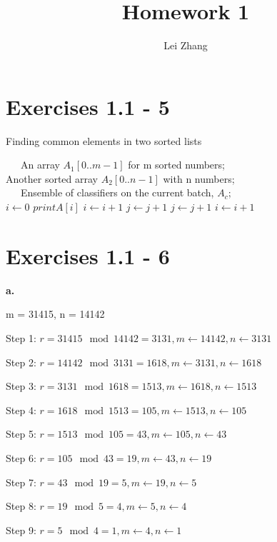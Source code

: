 \documentclass{article}
\title{Homework 1}
\author{Lei Zhang}
\begin{document}
\maketitle

\section{Exercises 1.1 - 5}

\begin{algorithm}
\caption{Finding common elements in two sorted lists}
\begin{algorithmic}[1]
\REQUIRE ~~\
An array $A_1[0..m-1]$ for m sorted numbers;\\
Another sorted array $A_2[0..n-1]$ with n numbers;\\
\ENSURE ~~\
Ensemble of classifiers on the current batch, $A_c$; \\
\STATE $ i \leftarrow 0 $
\WHILE {$ (i < m) and (j < n) $}
\STATE $print A[i]$
\STATE $i \leftarrow i + 1$
\STATE $j \leftarrow j + 1$
\STATE $j \leftarrow j + 1$
\ELSE
\STATE $i \leftarrow i +1$
\ENDIF
\ENDWHILE
\end{algorithmic}
\end{algorithm}

\section{Exercises 1.1 - 6}

\textbf{a.}

m = 31415, n = 14142

Step 1: $r = 31415 \mod 14142 = 3131, m \leftarrow 14142, n \leftarrow 3131 $

Step 2: $r = 14142 \mod 3131 = 1618, m \leftarrow 3131, n \leftarrow 1618 $

Step 3: $r = 3131 \mod 1618 = 1513, m \leftarrow 1618, n \leftarrow 1513 $

Step 4: $r = 1618 \mod 1513 = 105, m \leftarrow 1513, n \leftarrow 105 $

Step 5: $r = 1513 \mod 10 5= 43, m \leftarrow 105, n \leftarrow 43 $

Step 6: $r = 105 \mod 43 = 19, m \leftarrow 43, n \leftarrow 19 $

Step 7: $r = 43 \mod 19 = 5, m \leftarrow 19, n \leftarrow 5 $

Step 8: $r = 19 \mod 5 = 4, m \leftarrow 5, n \leftarrow 4 $

Step 9: $r = 5 \mod 4 = 1, m \leftarrow 4, n \leftarrow 1 $
\end{document}
